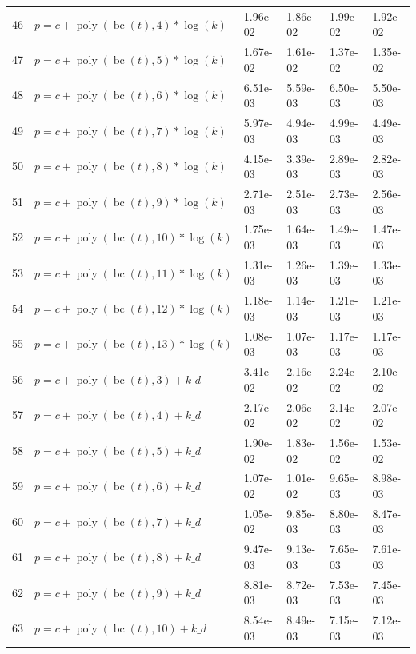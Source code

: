 \documentclass[12pt,a4paper]{article}
\DeclareMathOperator{\bc}{bc}
\DeclareMathOperator{\poly}{poly}
\begin{document}
\begin{longtable}[t]{ll>{\raggedleft\arraybackslash}p{2cm}>{\raggedleft\arraybackslash}p{2cm}>{\raggedleft\arraybackslash}p{2cm}>{\raggedleft\arraybackslash}p{2cm}}
46 & $p = c + \poly\left( \bc(t), 4 \right) * \log(k)$ & 1.96e-02 & 1.86e-02 & 1.99e-02 & 1.92e-02\\
\rowcolor{gray!6}  47 & $p = c + \poly\left( \bc(t), 5 \right) * \log(k)$ & 1.67e-02 & 1.61e-02 & 1.37e-02 & 1.35e-02\\
48 & $p = c + \poly\left( \bc(t), 6 \right) * \log(k)$ & 6.51e-03 & 5.59e-03 & 6.50e-03 & 5.50e-03\\
\rowcolor{gray!6}  49 & $p = c + \poly\left( \bc(t), 7 \right) * \log(k)$ & 5.97e-03 & 4.94e-03 & 4.99e-03 & 4.49e-03\\
50 & $p = c + \poly\left( \bc(t), 8 \right) * \log(k)$ & 4.15e-03 & 3.39e-03 & 2.89e-03 & 2.82e-03\\
\rowcolor{gray!6}  51 & $p = c + \poly\left( \bc(t), 9 \right) * \log(k)$ & 2.71e-03 & 2.51e-03 & 2.73e-03 & 2.56e-03\\
52 & $p = c + \poly\left( \bc(t), 10 \right) * \log(k)$ & 1.75e-03 & 1.64e-03 & 1.49e-03 & 1.47e-03\\
\rowcolor{gray!6}  53 & $p = c + \poly\left( \bc(t), 11 \right) * \log(k)$ & 1.31e-03 & 1.26e-03 & 1.39e-03 & 1.33e-03\\
54 & $p = c + \poly\left( \bc(t), 12 \right) * \log(k)$ & 1.18e-03 & 1.14e-03 & 1.21e-03 & 1.21e-03\\
\rowcolor{gray!6}  55 & $p = c + \poly\left( \bc(t), 13 \right) * \log(k)$ & 1.08e-03 & 1.07e-03 & 1.17e-03 & 1.17e-03\\
56 & $p = c + \poly\left( \bc(t), 3 \right) + k\_d$ & 3.41e-02 & 2.16e-02 & 2.24e-02 & 2.10e-02\\
\rowcolor{gray!6}  57 & $p = c + \poly\left( \bc(t), 4 \right) + k\_d$ & 2.17e-02 & 2.06e-02 & 2.14e-02 & 2.07e-02\\
58 & $p = c + \poly\left( \bc(t), 5 \right) + k\_d$ & 1.90e-02 & 1.83e-02 & 1.56e-02 & 1.53e-02\\
\rowcolor{gray!6}  59 & $p = c + \poly\left( \bc(t), 6 \right) + k\_d$ & 1.07e-02 & 1.01e-02 & 9.65e-03 & 8.98e-03\\
60 & $p = c + \poly\left( \bc(t), 7 \right) + k\_d$ & 1.05e-02 & 9.85e-03 & 8.80e-03 & 8.47e-03\\
\rowcolor{gray!6}  61 & $p = c + \poly\left( \bc(t), 8 \right) + k\_d$ & 9.47e-03 & 9.13e-03 & 7.65e-03 & 7.61e-03\\
62 & $p = c + \poly\left( \bc(t), 9 \right) + k\_d$ & 8.81e-03 & 8.72e-03 & 7.53e-03 & 7.45e-03\\
\rowcolor{gray!6}  63 & $p = c + \poly\left( \bc(t), 10 \right) + k\_d$ & 8.54e-03 & 8.49e-03 & 7.15e-03 & 7.12e-03\\

\end{longtable}
\end{document}
